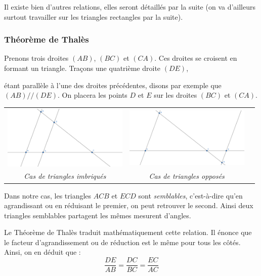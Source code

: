 \documentclass[a4paper, twoside]{article}
\begin{document}
\medbreak

Il existe bien d'autres relations, elles seront détaillés par la suite
(on va d'ailleurs surtout travailler sur les triangles rectangles par la suite).

\subsubsection{Théorème de Thalès}

Prenons trois droites $(AB)$, $(BC)$ et $(CA)$.
Ces droites se croisent en formant un triangle.
Traçons une quatrième droite $(DE)$,

étant parallèle à l'une des droites précédentes,
disons par exemple que $(AB) // (DE)$.
On placera les points $D$ et $E$ sur les droites $(BC)$ et $(CA)$.

\begin{center}
	\begin{tabular}{ccc}
		\includegraphics[width=6cm]{Image/triangle_tales_1.png} & \includegraphics[width=6cm]{Image/triangle_tales_2.png} \\
		\textit{Cas de triangles imbriqués}                     & \textit{Cas de triangles opposés}                       \\
	\end{tabular}
\end{center}

Dans notre cas, les triangles $ACB$ et $ECD$ sont \emph{semblables},
c'est-à-dire qu'en agrandissant ou en réduisant le premier,
on peut retrouver le second. Ainsi deux triangles semblables
partagent les mêmes mesurent d'angles.

Le Théorème de Thalès traduit mathématiquement cette relation.
Il énonce que le facteur d'agrandissement ou de réduction est le même
pour tous les côtés.
Ainsi, on en déduit que : $$\frac{DE}{AB} = \frac{DC}{BC} = \frac{EC}{AC}$$
\end{document}
